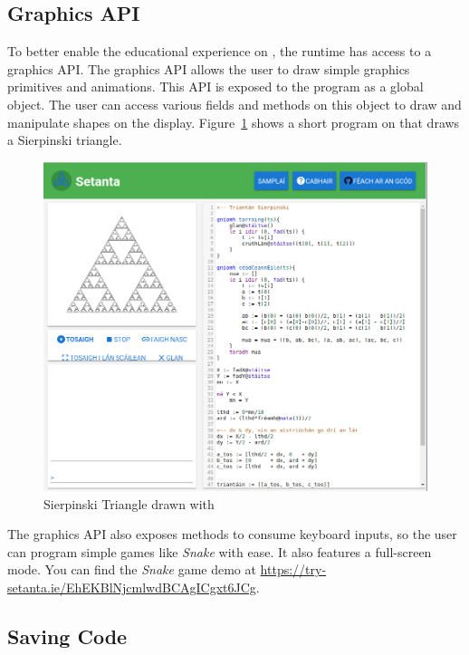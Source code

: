 \subsection{Graphics API}

To better enable the educational experience on \trys{}, the \Setanta{} runtime has access to a graphics API. The graphics API allows the user to draw simple graphics primitives and animations. This API is exposed to the \Setanta{} program as a global object. The user can access various fields and methods on this object to draw and manipulate shapes on the display. Figure~\ref{sierpinksitriangle} shows a short program on \trys{} that draws a Sierpinski triangle.

\begin{figure}[ht]
    \caption{Sierpinski Triangle drawn with \Setanta{}}
    \label{sierpinksitriangle}
    \begin{center}
    \includegraphics[scale=0.45]{sierpinskitriangle}
    \end{center}
\end{figure}

The graphics API also exposes methods to consume keyboard inputs, so the user can program simple games like \emph{Snake} with ease. It also features a full-screen mode. You can find the \emph{Snake} game demo at \url{https://try-setanta.ie/EhEKBlNjcmlwdBCAgICgxt6JCg}.

\subsection{Saving Code}

